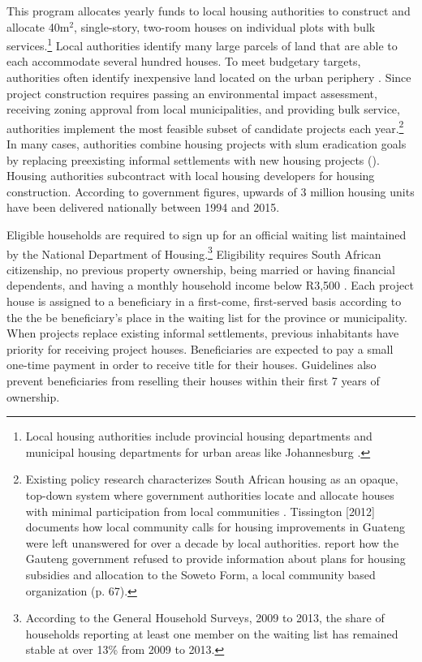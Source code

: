 \documentclass[12pt]{article}
\begin{document}
This program allocates yearly funds to local housing authorities to construct and allocate 40m$^2$, single-story, two-room houses on individual plots with bulk services.\footnote{Local housing authorities include provincial housing departments and municipal housing departments for urban areas like Johannesburg \citep{dhsreports}.}  Local authorities identify many large parcels of land that are able to each accommodate several hundred houses.  To meet budgetary targets, authorities often identify inexpensive land located on the urban periphery \citep{beninterview,dhsreports}.  Since project construction requires passing an environmental impact assessment, receiving zoning approval from local municipalities, and providing bulk service, authorities implement the most feasible subset of candidate projects each year.\footnote{Existing policy research characterizes South African housing as an opaque, top-down system where government authorities locate and allocate houses with minimal participation from local communities \citep{seriq}.  Tissington [2012] documents how local community calls for housing improvements in Guateng were left unanswered for over a decade by local authorities.  \cite{seriq} report how the Gauteng government refused to provide information about plans for housing subsidies and allocation to the Soweto Form, a local community based organization (p. 67).}  In many cases, authorities combine housing projects with slum eradication goals by replacing preexisting informal settlements with new housing projects (\cite{hofmeyr2008risk}).  Housing authorities subcontract with local housing developers for housing construction.  According to government figures, upwards of 3 million housing units have been delivered nationally between 1994 and 2015.


Eligible households are required to sign up for an official waiting list maintained by the National Department of Housing.\footnote{According to the General Household Surveys, 2009 to 2013, the share of households reporting at least one member on the waiting list has remained stable at over 13\% from 2009 to 2013.}  Eligibility requires South African citizenship, no previous property ownership, being married or having financial dependents, and having a monthly household income below R3,500 \citep{seriq}.  Each project house is assigned to a beneficiary in a first-come, first-served basis according to the the be beneficiary's place in the waiting list for the province or municipality. When projects replace existing informal settlements, previous inhabitants have priority for receiving project houses.  Beneficiaries are expected to pay a small one-time payment in order to receive title for their houses.  Guidelines also prevent beneficiaries from reselling their houses within their first 7 years of ownership.   %
\end{document}
